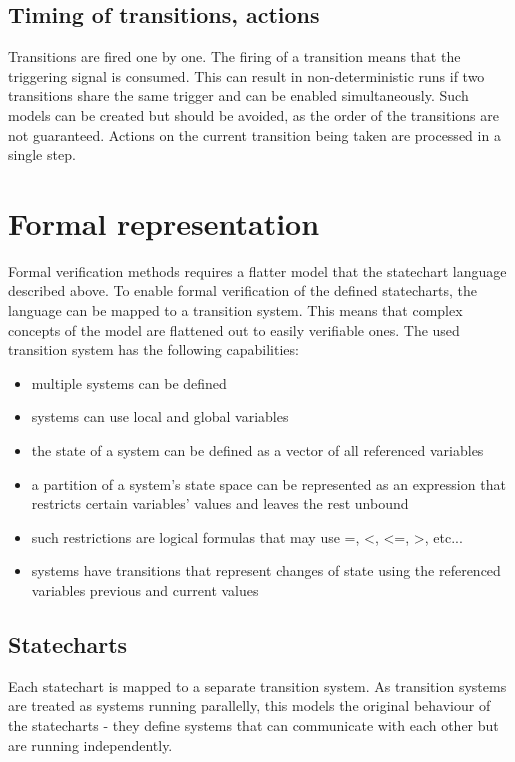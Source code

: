 \documentclass{book}
\begin{document}
{  \subsection{Timing of transitions, actions}
Transitions are fired one by one. The firing of a transition means that the triggering signal is consumed. This can result in non-deterministic runs if two transitions share the same trigger and can be enabled simultaneously. Such models can be created but should be avoided, as the order of the transitions are not guaranteed. Actions on the current transition being taken are processed in a single step.
\section{Formal representation}
Formal verification methods requires a flatter model that the statechart language described above. To enable formal verification of the defined statecharts, the language can be mapped to a transition system. This means that complex concepts of the model are flattened out to easily verifiable ones. The used transition system has the following capabilities:
\begin{itemize}
  \item multiple systems can be defined
  \item systems can use local and global variables
  \item the state of a system can be defined as a vector of all referenced variables
  \item a partition of a system's state space can be represented as an expression that restricts certain variables' values and leaves the rest unbound
  \item such restrictions are logical formulas that may use =, <, <=, >, etc...
  \item systems have transitions that represent changes of state using the referenced variables previous and current values
\end{itemize}
  \subsection{Statecharts}
Each statechart is mapped to a separate transition system. As transition systems are treated as systems running parallelly, this models the original behaviour of the statecharts - they define systems that can communicate with each other but are running independently.
}
\end{document}
